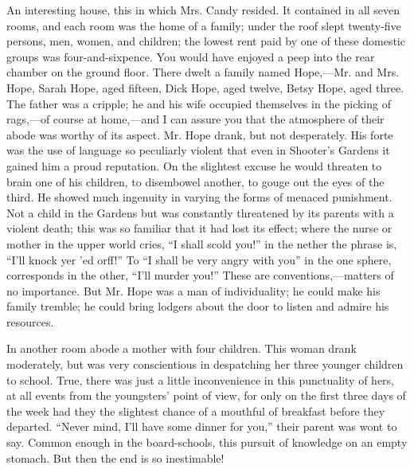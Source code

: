 An interesting house, this in which Mrs. Candy resided. It contained in
all seven rooms, and each room was the home of a family; under the roof
slept twenty-five persons, men, women, and children; the lowest rent
paid by one of these domestic groups was four-and-sixpence. You would
have enjoyed a peep into the rear chamber on the ground floor. There
dwelt a family named Hope,---Mr. and Mrs. Hope, Sarah Hope, aged
fifteen, Dick Hope, aged twelve, Betsy Hope, aged three. The father was
a cripple; he and his wife occupied themselves in the picking of
rags,---of course at home,---and I can assure you that the atmosphere of
their abode was worthy of its aspect. Mr. Hope drank, but not
desperately. His forte was the use of language so peculiarly violent
that even in Shooter's Gardens it gained him a proud reputation. On the
slightest excuse he would threaten to brain one of his children, to
disembowel another, to gouge out the eyes of the {}third. He showed much
ingenuity in varying the forms of menaced punishment. Not a child in the
Gardens but was constantly threatened by its parents with a violent
death; this was so familiar that it had lost its effect; where the nurse
or mother in the upper world cries, ``I shall scold you!'' in the nether
the phrase is, ``I'll knock yer 'ed orff!'' To ``I shall be very angry
with you'' in the one sphere, corresponds in the other, ``I'll murder
you!'' These are conventions,---matters of no importance. But Mr. Hope
was a man of individuality; he could make his family tremble; he could
bring lodgers about the door to listen and admire his resources.

In another room abode a mother with four children. This woman drank
moderately, but was very conscientious in despatching her three younger
children to school. True, there was just a little inconvenience in this
punctuality of hers, at all events from the youngsters' point of view,
for only on the first three days of the week had they the slightest
chance of a mouthful of breakfast before they departed. ``Never mind,
I'll have some dinner for you,'' their parent was wont to say. Common
enough {}in the board-schools, this pursuit of knowledge on an empty
stomach. But then the end is so inestimable!


